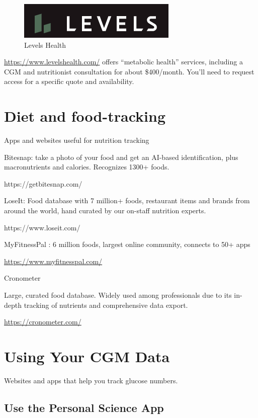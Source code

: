 \documentclass[
]{book}
\begin{document}
\begin{figure}
\centering
\includegraphics{images/levelshealth-logo.png}
\caption{Levels Health}
\end{figure}

\url{https://www.levelshealth.com/} offers ``metabolic health'' services, including a CGM and nutritionist consultation for about \$400/month. You'll need to request access for a specific quote and availability.

\hypertarget{diet-and-food-tracking}{%
\chapter{Diet and food-tracking}\label{diet-and-food-tracking}}

Apps and websites useful for nutrition tracking

Bitesnap: take a photo of your food and get an AI-based identification, plus macronutrients and calories. Recognizes 1300+ foods.

https://getbitesnap.com/

LoseIt: Food database with 7 million+ foods, restaurant items and brands from around the world, hand curated by our on-staff nutrition experts.

https://www.loseit.com/

MyFitnessPal : 6 million foods, largest online community, connects to 50+ apps

\url{https://www.myfitnesspal.com/}

Cronometer

Large, curated food database. Widely used among professionals due to its in-depth tracking of nutrients and comprehensive data export.

\url{https://cronometer.com/}

\hypertarget{using-your-cgm-data}{%
\chapter{Using Your CGM Data}\label{using-your-cgm-data}}

Websites and apps that help you track glucose numbers.

\hypertarget{use-the-personal-science-app}{%
\section{Use the Personal Science App}\label{use-the-personal-science-app}}
\end{document}
